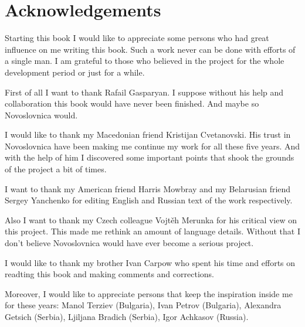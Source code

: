 \chapter{Acknowledgements}

Starting this book I would like to appreciate some persons who had great influence on me writing this book. Such a work never can be done with efforts of a single man. I am grateful to those who believed in the project for the whole development period or just for a while.

First of all I want to thank Rafail Gasparyan. I suppose without his help and collaboration this book would have never been finished. And maybe so Novoslovnica would.

I would like to thank my Macedonian friend Kristijan Cvetanovski. His trust in Novoslovnica have been making me continue my work for all these five years. And with the help of him I discovered some important points that shook the grounds of the project a bit of times.

I want to thank my American friend Harris Mowbray and my Belarusian friend Sergey Yanchenko for editing English and Russian text of the work respectively.

Also I want to thank my Czech colleague Vojtěh Merunka for his critical view on this project. This made me rethink an amount of language details. Without that I don't believe Novoslovnica would have ever become a serious project. 

I would like to thank my brother Ivan Carpow who spent his time and efforts on readting this book and making comments and corrections.

Moreover, I would like to appreciate persons that keep the inspiration inside me for these years: Manol Terziev (Bulgaria), Ivan Petrov (Bulgaria), Alexandra Getsich (Serbia), Ljiljana Bradich (Serbia), Igor Achkasov (Russia).
